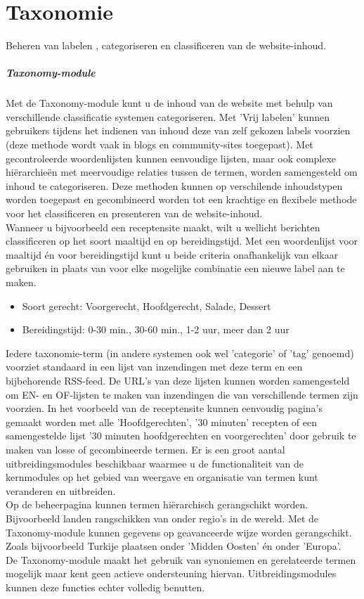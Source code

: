 \section{Taxonomie} 
Beheren van labelen , categoriseren  en
classificeren  van de website-inhoud.
\subparagraph{Taxonomy-module} 
Met de Taxonomy-module kunt u de inhoud van de website met behulp van verschillende
classificatie systemen categoriseren. Met 'Vrij labelen' kunnen gebruikers tijdens het
indienen van inhoud deze van zelf gekozen labels voorzien (deze methode wordt vaak in
blogs en community-sites toegepast). Met gecontroleerde woordenlijsten kunnen eenvoudige
lijsten, maar ook complexe hi\"erarchie\"en met meervoudige relaties tussen de termen, worden
samengesteld om inhoud te categoriseren. Deze methoden kunnen op verschilende inhoudstypen
worden toegepast en gecombineerd worden tot een krachtige en flexibele methode voor het
classificeren en presenteren van de website-inhoud.
\\
Wanneer u bijvoorbeeld een receptensite maakt, wilt u wellicht berichten classificeren op het
soort maaltijd en op bereidingstijd. Met een woordenlijst voor maaltijd \'en
voor bereidingstijd kunt u beide criteria onafhankelijk van elkaar gebruiken in plaats van voor elke mogelijke combinatie een nieuwe label aan te maken.
\begin{itemize}
\item Soort gerecht: Voorgerecht, Hoofdgerecht, Salade, Dessert
\item Bereidingstijd: 0-30 min., 30-60 min., 1-2 uur, meer dan 2 uur
\end{itemize}
Iedere taxonomie-term (in andere systemen ook wel 'categorie' of 'tag' genoemd) voorziet standaard
in een lijst van inzendingen met deze term en een bijbehorende RSS-feed. De URL's van deze lijsten
kunnen worden samengesteld om EN- en OF-lijsten te maken van inzendingen die van verschillende termen
zijn voorzien. In het voorbeeld van de receptensite kunnen eenvoudig pagina's gemaakt worden met alle
'Hoofdgerechten', '30 minuten' recepten of een samengestelde lijst '30 minuten hoofdgerechten en voorgerechten'
door gebruik te maken van losse of gecombineerde termen. Er is een groot aantal uitbreidingsmodules beschikbaar
waarmee u de functionaliteit van de kernmodules op het gebied van weergave en organisatie van termen kunt veranderen en uitbreiden.
\\
Op de beheerpagina kunnen termen hi\"erarchisch gerangschikt worden. Bijvoorbeeld landen rangschikken van onder regio's in de wereld.
Met de Taxonomy-module kunnen gegevens op geavanceerde wijze worden gerangschikt. Zoals bijvoorbeeld Turkije plaatsen onder
'Midden Oosten' \'en onder 'Europa'.
\\
De Taxonomy-module maakt het gebruik van synoniemen en gerelateerde termen mogelijk maar kent geen actieve ondersteuning hiervan.
Uitbreidingsmodules kunnen deze functies echter volledig benutten.
